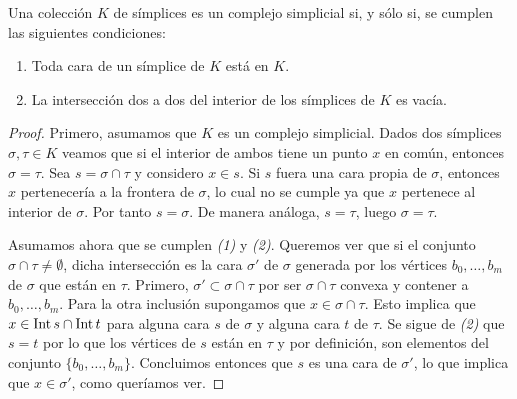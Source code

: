 \begin{lema}
	Una colección $K$ de símplices es un complejo simplicial si, y sólo si, se cumplen
	las siguientes condiciones:
	\begin{enumerate}
		\item Toda cara de un símplice de $K$ está en $K$.
		
		\item La intersección dos a dos del interior de los símplices de $K$ es vacía.
	\end{enumerate}
\end{lema}
\begin{proof}
	Primero, asumamos que $K$ es un complejo simplicial. Dados dos símplices $\sigma
	, \tau \in K$ veamos que si el interior de ambos tiene un punto $x$ en común,
	entonces $\sigma = \tau$. Sea $s = \sigma \cap \tau$ y considero $x \in s$. Si
	$s$ fuera una cara propia de $\sigma$, entonces $x$ pertenecería a la frontera
	de $\sigma$, lo cual no se cumple ya que $x$ pertenece al interior de $\sigma$.
	Por tanto $s = \sigma$. De manera análoga, $s = \tau$, luego $\sigma = \tau$.
	
	Asumamos ahora que se cumplen \textit{(1)} y \textit{(2)}. Queremos ver que si
	el conjunto $\sigma \cap \tau \neq \emptyset$, dicha intersección es la cara
	$\sigma'$ de $\sigma$ generada por los vértices $b_{0},\ldots,b_{m}$ de
	$\sigma$ que están en $\tau$. Primero, $\sigma' \subset \sigma \cap \tau$ por
	ser $\sigma \cap \tau$ convexa y contener a $b_{0}, \ldots, b_{m}$. Para la otra
	inclusión supongamos que $x \in \sigma \cap \tau$. Esto implica que
	$x \in \operatorname{Int} s \cap \operatorname{Int} t$ para alguna cara $s$ de $\sigma$ y alguna
	cara $t$ de $\tau$. Se sigue de \textit{(2)} que $s = t$ por lo que los
	vértices de $s$ están en $\tau$ y por definición, son elementos del conjunto $\{
	b_{0}, \ldots, b_{m}\}$. Concluimos entonces que $s$ es una cara de $\sigma'$,
	lo que implica que $x \in \sigma'$, como queríamos ver.
\end{proof}

